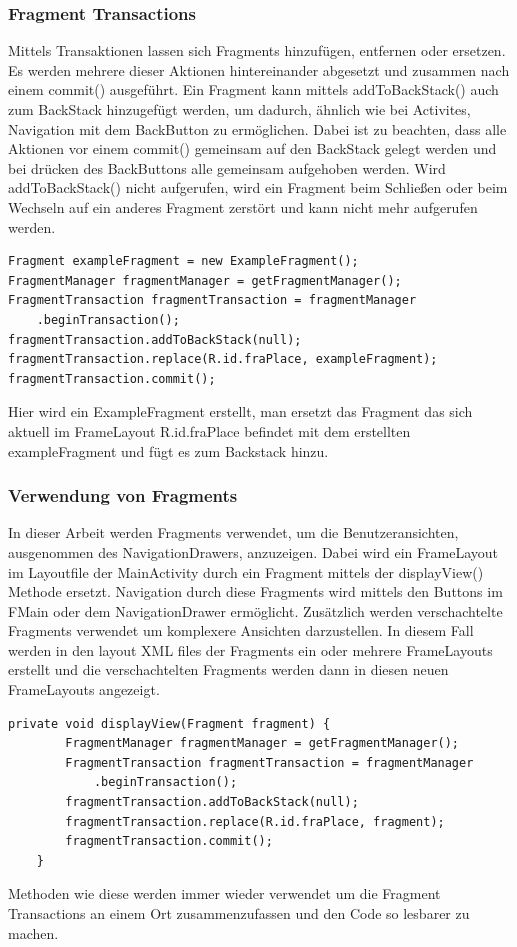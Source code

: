 \documentclass[FIPLY_base.tex]{subfiles}
\begin{document}
\subsubsection{Fragment Transactions}
Mittels Transaktionen lassen sich Fragments hinzufügen, entfernen oder ersetzen.
Es werden mehrere dieser Aktionen hintereinander abgesetzt und zusammen nach einem commit() ausgeführt.
Ein Fragment kann mittels addToBackStack() auch zum BackStack hinzugefügt werden, um dadurch, ähnlich wie bei Activites, Navigation mit dem BackButton zu ermöglichen.
Dabei ist zu beachten, dass alle Aktionen vor einem commit() gemeinsam auf den BackStack gelegt werden und bei drücken des BackButtons alle gemeinsam aufgehoben werden.
Wird addToBackStack() nicht aufgerufen, wird ein Fragment beim Schließen oder beim Wechseln auf ein anderes Fragment zerstört und kann nicht mehr aufgerufen werden.

\begin{lstlisting}
Fragment exampleFragment = new ExampleFragment();
FragmentManager fragmentManager = getFragmentManager();
FragmentTransaction fragmentTransaction = fragmentManager
	.beginTransaction();
fragmentTransaction.addToBackStack(null);
fragmentTransaction.replace(R.id.fraPlace, exampleFragment);
fragmentTransaction.commit();
\end{lstlisting}
Hier wird ein ExampleFragment erstellt, man ersetzt das Fragment das sich aktuell im FrameLayout R.id.fraPlace befindet mit dem erstellten exampleFragment und fügt es zum Backstack hinzu.


\newpage
\subsubsection{Verwendung von Fragments}
In dieser Arbeit werden Fragments verwendet, um die Benutzeransichten, ausgenommen des NavigationDrawers, anzuzeigen.
Dabei wird ein FrameLayout im Layoutfile der MainActivity durch ein Fragment mittels der displayView() Methode ersetzt.
Navigation durch diese Fragments wird mittels den Buttons im FMain oder dem NavigationDrawer ermöglicht.
Zusätzlich werden verschachtelte Fragments verwendet um komplexere Ansichten darzustellen. In diesem Fall werden in den layout XML files der Fragments ein oder mehrere FrameLayouts erstellt und die verschachtelten Fragments werden dann in diesen neuen FrameLayouts angezeigt.
\ \\
\begin{lstlisting}
private void displayView(Fragment fragment) {
        FragmentManager fragmentManager = getFragmentManager();
        FragmentTransaction fragmentTransaction = fragmentManager
        	.beginTransaction();
        fragmentTransaction.addToBackStack(null);
        fragmentTransaction.replace(R.id.fraPlace, fragment);
        fragmentTransaction.commit();
    }
\end{lstlisting}
Methoden wie diese werden immer wieder verwendet um die Fragment Transactions an einem Ort zusammenzufassen und den Code so lesbarer zu machen.
\end{document}
